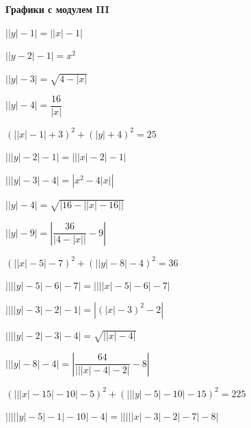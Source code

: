 \centerline{\bf \Huge Графики с модулем III}

 $\left|\left|y\right|-1\right|=\left|\left|x\right|-1\right|$

 $\left|\left|y-2\right|-1\right|=x^{2}$

 $\left|\left|y\right|-3\right|=\sqrt{4-\left|x\right|}$

 $\left|\left|y\right|-4\right|=\dfrac{16}{\left|x\right|}$

 $\left(\left|\left|x\right|-1\right|+3\right)^{2}+\left(\left|y\right|+4\right)^{2}=25$

 $\left|\left|\left|y\right|-2\right|-1\right|=\left|\left|\left|x\right|-2\right|-1\right|$

 $\left|\left|\left|y\right|-3\right|-4\right|=\left|x^{2}-4\left|x\right|\right|$

 $\left|\left|y\right|-4\right|=\sqrt{\left|16-\left|\left|x\right|-16\right|\right|}$

 $\left|\left|y\right|-9\right|=\left|\dfrac{36}{\left|4-\left|x\right|\right|}-9\right|$

 $\left(\left|\left|x\right|-5\right|-7\right)^{2}+\left(\left|\left|y\right|-8\right|-4\right)^{2}=36$

 $\left|\left|\left|\left|y\right|-5\right|-6\right|-7\right|=\left|\left|\left|\left|x\right|-5\right|-6\right|-7\right|$

 $\left|\left|\left|\left|y\right|-3\right|-2\right|-1\right|=\left|\left(\left|x\right|-3\right)^{2}-2\right|$

 $\left|\left|\left|\left|y\right|-2\right|-3\right|-4\right|=\sqrt{\left|\left|x\right|-4\right|}$

 $\left|\left|\left|y\right|-8\right|-4\right|=\left|\dfrac{64}{\left|\left|\left|x\right|-4\right|-2\right|}-8\right|$

 $\left(\left|\left|\left|x\right|-15\right|-10\right|-5\right)^{2}+\left(\left|\left|\left|y\right|-5\right|-10\right|-15\right)^{2}=225$

 $\left|\left|\left|\left|\left|y\right|-5\right|-1\right|-10\right|-4\right|=\left|\left|\left|\left|\left|x\right|-3\right|-2\right|-7\right|-8\right|$

